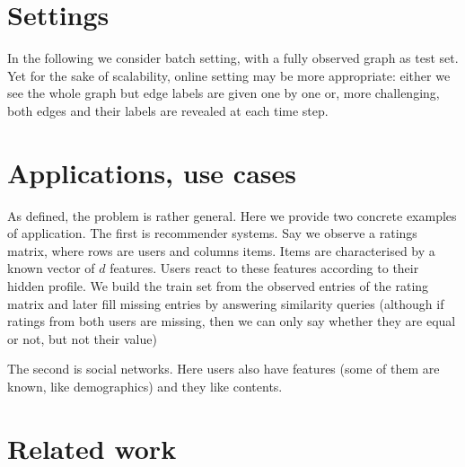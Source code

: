 \section{Settings}

In the following we consider batch setting, with a fully observed graph as test
set. Yet for the sake of scalability, online setting may be more appropriate:
either we see the whole graph but edge labels are given one by one or, more
challenging, both edges and their labels are revealed at each time step.

\section{Applications, use cases}

As defined, the problem is rather general. Here we provide two concrete
examples of application. The first is recommender systems. Say we observe a
ratings matrix, where rows are users and columns items. Items are characterised
by a known vector of $d$ features. Users react to these features according to
their hidden profile. We build the train set from the observed entries of the
rating matrix and later fill missing entries by answering similarity queries
(although if ratings from both users are missing, then we can only say whether
they are equal or not, but not their value)

The second is social networks. Here users also have features (some of them are
known, like demographics) and they like contents. 

\section{Related work}

